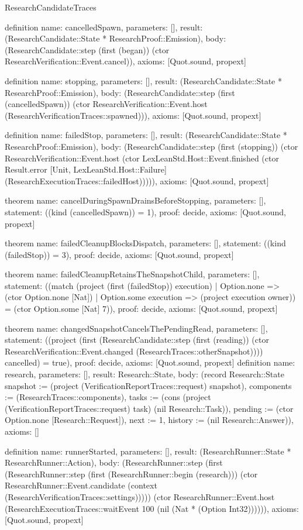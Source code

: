 \begin{lexlean}{ResearchCandidateTraces}
\begin{semanticmodule}
definition{
 name: cancelledSpawn,
 parameters: [],
 result: (ResearchCandidate::State * ResearchProof::Emission),
 body: (ResearchCandidate::step (first (began)) (ctor ResearchVerification::Event.cancel)),
 axioms: [Quot.sound, propext]
}

definition{
 name: stopping,
 parameters: [],
 result: (ResearchCandidate::State * ResearchProof::Emission),
 body: (ResearchCandidate::step (first (cancelledSpawn)) (ctor ResearchVerification::Event.host (ResearchVerificationTraces::spawned))),
 axioms: [Quot.sound, propext]
}

definition{
 name: failedStop,
 parameters: [],
 result: (ResearchCandidate::State * ResearchProof::Emission),
 body: (ResearchCandidate::step (first (stopping)) (ctor ResearchVerification::Event.host (ctor LexLeanStd.Host::Event.finished (ctor Result.error [Unit, LexLeanStd.Host::Failure] (ResearchExecutionTraces::failedHost))))),
 axioms: [Quot.sound, propext]
}

theorem{
 name: cancelDuringSpawnDrainsBeforeStopping,
 parameters: [],
 statement: ((kind (cancelledSpawn)) = 1),
 proof: decide{},
 axioms: [Quot.sound, propext]
}

theorem{
 name: failedCleanupBlocksDispatch,
 parameters: [],
 statement: ((kind (failedStop)) = 3),
 proof: decide{},
 axioms: [Quot.sound, propext]
}

theorem{
 name: failedCleanupRetainsTheSnapshotChild,
 parameters: [],
 statement: ((match (project (first (failedStop)) execution) | Option.none => (ctor Option.none [Nat]) | Option.some execution => (project execution owner)) = (ctor Option.some [Nat] 7)),
 proof: decide{},
 axioms: [Quot.sound, propext]
}

theorem{
 name: changedSnapshotCancelsThePendingRead,
 parameters: [],
 statement: ((project (first (ResearchCandidate::step (first (reading)) (ctor ResearchVerification::Event.changed (ResearchTraces::otherSnapshot)))) cancelled) = true),
 proof: decide{},
 axioms: [Quot.sound, propext]
}
definition{
 name: research,
 parameters: [],
 result: Research::State,
 body: (record Research::State {snapshot := (project (VerificationReportTraces::request) snapshot), components := (ResearchTraces::components), tasks := (cons (project (VerificationReportTraces::request) task) (nil Research::Task)), pending := (ctor Option.none [Research::Request]), next := 1, history := (nil Research::Answer)}),
 axioms: []
}

definition{
 name: runnerStarted,
 parameters: [],
 result: (ResearchRunner::State * ResearchRunner::Action),
 body: (ResearchRunner::step (first (ResearchRunner::step (first (ResearchRunner::begin (research))) (ctor ResearchRunner::Event.candidate (context (ResearchVerificationTraces::settings))))) (ctor ResearchRunner::Event.host (ResearchExecutionTraces::waitEvent 100 (nil (Nat * (Option Int32)))))),
 axioms: [Quot.sound, propext]
}


\end{semanticmodule}
\end{lexlean}
